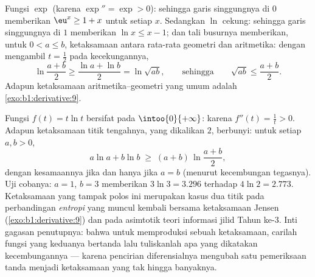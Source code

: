 \begin{example}\label{ex:b1:derivative:convexineq}
Fungsi $\exp$  (karena $\exp'' = \exp > 0$): sehingga garis singgungnya di $0$ memberikan
$\eu^x \geq 1 + x$ untuk setiap $x$. Sedangkan $\ln$ cekung: sehingga garis singgungnya di $1$
memberikan $\ln x \leq x - 1$; dan tali busurnya memberikan, untuk $0 < a \leq b$,
ketaksamaan antara rata-rata geometri dan aritmetika: dengan mengambil $t =
\frac12$ pada kecekungannya,
\[
\ln\frac{a + b}{2} \geq \frac{\ln a + \ln b}{2} = \ln\sqrt{ab},
\qquad\text{sehingga}\qquad
\sqrt{ab} \leq \frac{a+b}{2} .
\]
Adapun ketaksamaan aritmetika--geometri yang umum adalah
\cref{exo:b1:derivative:9}.
\end{example}

\begin{example}\label{ex:b1:derivative:xlnx}
Fungsi $f(t) = t\ln t$ bersifat  pada $\intoo{0}{+\infty}$:
karena $f''(t) = \frac1t > 0$. Adapun ketaksamaan titik tengahnya, yang dikalikan
$2$, berbunyi: untuk setiap $a, b > 0$,
\[
a\ln a + b\ln b \;\geq\; (a + b)\,\ln\frac{a + b}{2} ,
\]
dengan kesamaannya jika dan hanya jika $a = b$ (menurut kecembungan tegasnya). Uji cobanya: $a =
1$, $b = 3$ memberikan $3\ln 3 = 3.296$ terhadap $4\ln 2 = 2.773$.
Ketaksamaan yang tampak polos ini merupakan kasus dua titik pada
perbandingan \emph{entropi} yang muncul kembali bersama ketaksamaan
Jensen (\cref{exo:b1:derivative:9}) dan pada
asimtotik teori informasi jilid Tahun ke-3. Inti
gagasan penutupnya: bahwa untuk memproduksi sebuah ketaksamaan, carilah fungsi
yang  keduanya bertanda lalu tuliskanlah apa yang dikatakan kecembungannya
--- karena pencirian diferensialnya mengubah satu pemeriksaan tanda
menjadi ketaksamaan yang tak hingga banyaknya.
\end{example}

